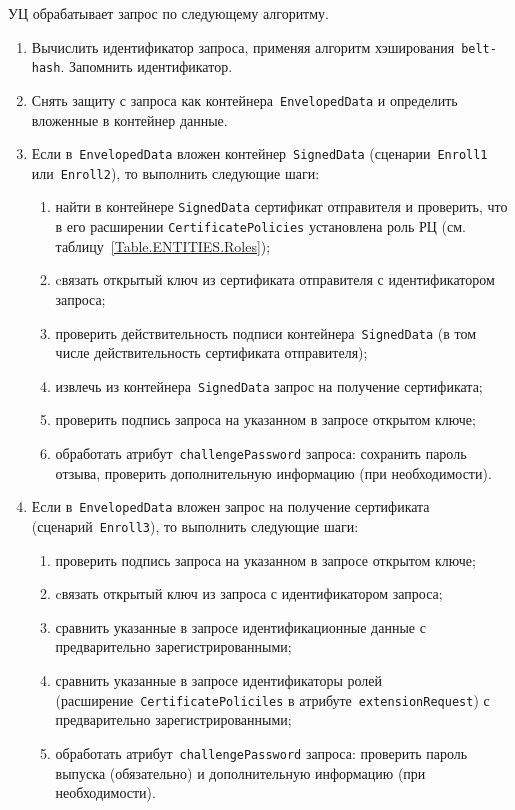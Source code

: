 УЦ обрабатывает запрос по следующему алгоритму.

\begin{enumerate}
\item
Вычислить идентификатор запроса, применяя 
алгоритм хэширования~\texttt{belt-hash}. 
Запомнить идентификатор.

\item
Снять защиту с запроса как контейнера~\texttt{EnvelopedData} 
и определить вложенные в контейнер данные.

\item
Если в~\texttt{EnvelopedData} вложен контейнер~\texttt{SignedData}
(сценарии~\texttt{Enroll1} или~\texttt{Enroll2}), 
то выполнить следующие шаги:

\begin{enumerate}
\item
найти в контейнере \texttt{SignedData} сертификат отправителя
и проверить, что в его расширении \texttt{CertificatePolicies} 
установлена роль РЦ (см. таблицу~\ref{Table.ENTITIES.Roles});
\item
cвязать открытый ключ из сертификата отправителя с идентификатором 
запроса;
\item
проверить действительность подписи контейнера~\texttt{SignedData}
(в том числе действительность сертификата отправителя);
\item
извлечь из контейнера~\texttt{SignedData} запрос на получение сертификата;
\item
проверить подпись запроса на указанном в запросе открытом ключе;
\item
обработать атрибут~\texttt{challengePassword} запроса:
сохранить пароль отзыва, проверить дополнительную информацию
(при необходимости).
\end{enumerate}

\item
Если в~\texttt{EnvelopedData} вложен запрос на получение сертификата
(сценарий~\texttt{Enroll3}), то выполнить следующие шаги:
\begin{enumerate}
\item
проверить подпись запроса на указанном в запросе открытом ключе;
\item
cвязать открытый ключ из запроса с идентификатором запроса;
\item
сравнить указанные в запросе идентификационные данные с предварительно
зарегистрированными;
\item
сравнить указанные в запросе идентификаторы ролей 
(расширение~\texttt{CertificatePoliciles} в 
атрибуте~\texttt{extensionRequest}) с предварительно зарегистрированными; 
\item
обработать атрибут~\texttt{challengePassword} запроса:
проверить пароль выпуска (обязательно) и  
дополнительную информацию (при необходимости).
\end{enumerate}


\end{enumerate}
